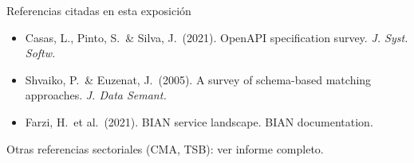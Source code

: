 \documentclass[aspectratio=169,11pt,spanish]{beamer}
\begin{document}
\begin{frame}{Referencias citadas en esta exposición}
  \begin{planpanel}
  \begin{itemize}
    \item Casas, L., Pinto, S.\ \& Silva, J.\ (2021). OpenAPI specification survey. \textit{J. Syst. Softw.}
    \item Shvaiko, P.\ \& Euzenat, J.\ (2005). A survey of schema-based matching approaches. \textit{J. Data Semant.}
    \item Farzi, H.\ et al.\ (2021). BIAN service landscape. BIAN documentation.
  \end{itemize}
  \end{planpanel}
  \vspace{0.35em}
  {\large Otras referencias sectoriales (CMA, TSB): ver informe completo.}
\end{frame}
\end{document}
